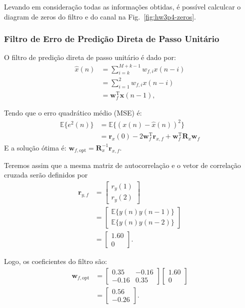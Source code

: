 Levando em consideração todas as informações obtidas, é possível calculcar o diagram de zeros do filtro e do canal na Fig.~\ref{fig:hw3p4-zeros}.

\subsubsection*{Filtro de Erro de Predição Direta de Passo Unitário}
O filtro de predição direta de passo unitário é dado por:
\begin{align*}
    \hat{x}(n) &= \sum^{M + k - 1}_{i = k} w_{f,i} x(n - i) \\
    &= \sum^{2}_{i = 1} w_{f,i} x(n - i) \\
    &= \mathbf{w}^{\text{T}}_{f} \mathbf{x}(n - 1),
\end{align*}

Tendo que o erro quadrático médio (MSE) é:
\begin{align*}
    \mathbb{E}\{e^{2}(n)\} &= \mathbb{E}\{(x(n) - \hat{x}(n) )^{2}\} \\
    &= \mathbf{r}_{x}(0) - 2 \mathbf{w}^{\text{T}}_{f} \mathbf{r}_{x,f} + \mathbf{w}^{\text{T}}_{f} \mathbf{R}_{x} \mathbf{w}_{f}
\end{align*}
E a solução ótima é: $ \mathbf{w}_{f,\text{opt}} = \mathbf{R}^{-1}_{x} \mathbf{r}_{x,f} $.

Teremos assim que a mesma matriz de autocorrelação e o vetor de correlação cruzada serão definidos por
\begin{align*}
    \mathbf{r}_{y,f} &= 
    \begin{bmatrix}
        r_{y}(1) \\
        r_{y}(2)
    \end{bmatrix} \\
    & =
    \begin{bmatrix}
        \mathbb{E}\{y(n) y(n - 1)\} \\
        \mathbb{E}\{y(n) y(n - 2)\}
    \end{bmatrix} \\
    & = 
    \begin{bmatrix}
        1.60 \\
        0
    \end{bmatrix}.
\end{align*}

Logo, os coeficientes do filtro são:
\begin{align*}
    \mathbf{w}_{f,\text{opt}} &= 
    \begin{bmatrix}
        0.35 & -0.16 \\
        -0.16 & 0.35
    \end{bmatrix}
    \begin{bmatrix}
        1.60 \\
        0
    \end{bmatrix} \\ 
    &=
    \begin{bmatrix}
        0.56 \\
        -0.26
    \end{bmatrix}.
\end{align*}

